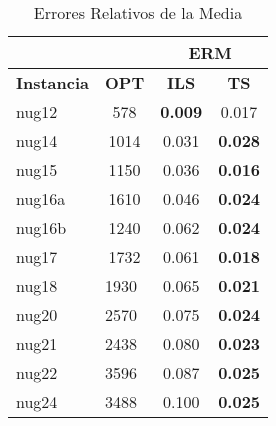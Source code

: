 \documentclass{ci5652}
\begin{document}
\begin{table}[ht]
  \label{table:erm}
    \caption{Errores Relativos de la Media}
    \centering
    \begin{tabular}{ll|c|c|}
    \cline{3-4}
                                             & \multicolumn{1}{c|}{\textbf{}}    & \multicolumn{2}{c|}{\textbf{ERM}} \\ \hline
  \multicolumn{1}{|l|}{\textbf{Instancia}} & \multicolumn{1}{c|}{\textbf{OPT}} & \textbf{ILS}                & \textbf{TS}                \\ \hline
  \multicolumn{1}{|l|}{nug12}              & \multicolumn{1}{c|}{578}          & \textbf{0.009}              & 0.017                      \\ \hline
  \multicolumn{1}{|l|}{nug14}              & \multicolumn{1}{c|}{1014}         & 0.031                       & \textbf{0.028}             \\ \hline
  \multicolumn{1}{|l|}{nug15}              & \multicolumn{1}{c|}{1150}         & 0.036                       & \textbf{0.016}             \\ \hline
  \multicolumn{1}{|l|}{nug16a}             & \multicolumn{1}{c|}{1610}         & 0.046                       & \textbf{0.024}             \\ \hline
  \multicolumn{1}{|l|}{nug16b}             & \multicolumn{1}{c|}{1240}         & 0.062                       & \textbf{0.024}             \\ \hline
  \multicolumn{1}{|l|}{nug17}              & \multicolumn{1}{c|}{1732}         & 0.061                       & \textbf{0.018}             \\ \hline
  \multicolumn{1}{|l|}{nug18}              & 1930                              & 0.065                       & \textbf{0.021}             \\ \hline
  \multicolumn{1}{|l|}{nug20}              & 2570                              & 0.075                       & \textbf{0.024}             \\ \hline
  \multicolumn{1}{|l|}{nug21}              & 2438                              & 0.080                       & \textbf{0.023}             \\ \hline
  \multicolumn{1}{|l|}{nug22}              & 3596                              & 0.087                       & \textbf{0.025}             \\ \hline
  \multicolumn{1}{|l|}{nug24}              & 3488                              & 0.100                       & \textbf{0.025}             \\ \hline

\end{tabular}
\end{table}
\end{document}
